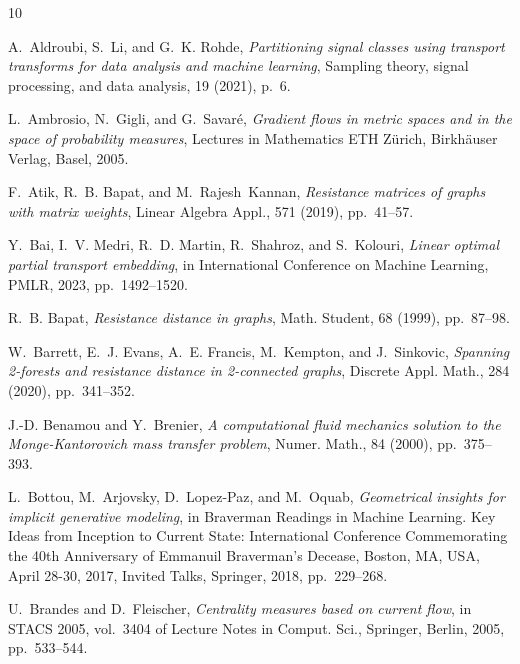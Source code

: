 \documentclass[11pt,a4paper]{article}
\begin{document}
\begin{thebibliography}{10}

    {\sc A.~Aldroubi, S.~Li, and G.~K. Rohde}, {\em Partitioning signal classes using transport transforms for data analysis and machine learning}, Sampling theory, signal processing, and data analysis, 19 (2021), p.~6.

    {\sc L.~Ambrosio, N.~Gigli, and G.~Savar\'e}, {\em Gradient flows in metric spaces and in the space of probability measures}, Lectures in Mathematics ETH Z\"urich, Birkh\"auser Verlag, Basel, 2005.

    {\sc F.~Atik, R.~B. Bapat, and M.~Rajesh~Kannan}, {\em Resistance matrices of graphs with matrix weights}, Linear Algebra Appl., 571 (2019), pp.~41--57.

    {\sc Y.~Bai, I.~V. Medri, R.~D. Martin, R.~Shahroz, and S.~Kolouri}, {\em Linear optimal partial transport embedding}, in International Conference on Machine Learning, PMLR, 2023, pp.~1492--1520.

    {\sc R.~B. Bapat}, {\em Resistance distance in graphs}, Math. Student, 68 (1999), pp.~87--98.

    {\sc W.~Barrett, E.~J. Evans, A.~E. Francis, M.~Kempton, and J.~Sinkovic}, {\em Spanning 2-forests and resistance distance in 2-connected graphs}, Discrete Appl. Math., 284 (2020), pp.~341--352.

    {\sc J.-D. Benamou and Y.~Brenier}, {\em A computational fluid mechanics solution to the {M}onge-{K}antorovich mass transfer problem}, Numer. Math., 84 (2000), pp.~375--393.

    {\sc L.~Bottou, M.~Arjovsky, D.~Lopez-Paz, and M.~Oquab}, {\em Geometrical insights for implicit generative modeling}, in Braverman Readings in Machine Learning. Key Ideas from Inception to Current State: International Conference Commemorating the 40th Anniversary of Emmanuil Braverman's Decease, Boston, MA, USA, April 28-30, 2017, Invited Talks, Springer, 2018, pp.~229--268.

    {\sc U.~Brandes and D.~Fleischer}, {\em Centrality measures based on current flow}, in S{TACS} 2005, vol.~3404 of Lecture Notes in Comput. Sci., Springer, Berlin, 2005, pp.~533--544.


\end{thebibliography}
\end{document}
